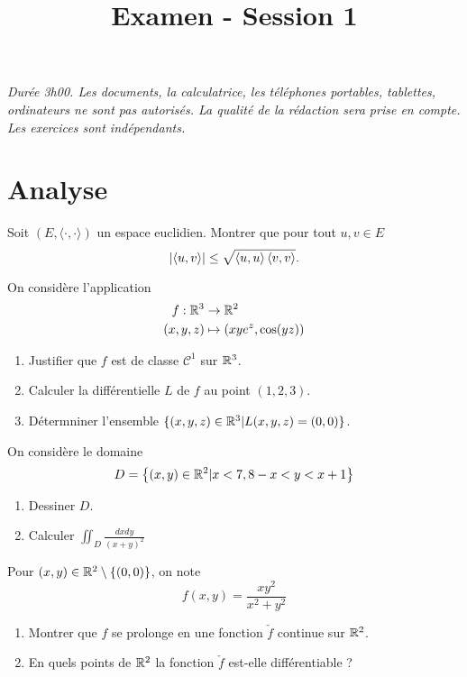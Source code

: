 \documentclass{tp_um}
\title{\Large \sffamily\bfseries Examen - Session 1}
\begin{document}
\maketitle

\bigskip

\textit{Durée 3h00. Les documents, la calculatrice, les téléphones portables, tablettes, ordinateurs ne sont pas autorisés. La qualité de la rédaction sera prise en compte. Les exercices sont indépendants.} 

\bigskip
\bigskip

\section{Analyse}

\exo{} Soit $(E,\langle\cdot,\cdot\rangle)$ un espace euclidien. Montrer que pour tout $u,v\in E$ 
\[
	\left\lvert\left\langle u,v\right\rangle\right\rvert \leq \sqrt{\left\langle u,u\right\rangle \left\langle v,v\right\rangle}.
\]

\exo{}
On considère l'application 
\begin{align*}
	f : \mathbb{R}^3 & \to \mathbb{R}^2 \\
(x,y,z) & \mapsto (xye^z,\cos(yz))
\end{align*}
\begin{enumerate}
	\item Justifier que $f$ est de classe $\mathcal C^1$ sur $\mathbb{R}^3$.
	\item Calculer la différentielle $L$ de $f$ au point $(1,2,3)$.
	\item Détermniner l'ensemble $\{ (x,y,z)\in \mathbb{R}^3 | L(x,y,z) = (0,0) \}$. 
\end{enumerate}

\exo{} On considère le domaine 
\[
	D = \left\{ (x,y) \in\mathbb{R}^2 | x <7, 8-x <y<x+1 \right\}
\]
\begin{enumerate}
	\item Dessiner $D$.
	\item Calculer $\iint_D \frac{dxdy}{(x+y)^2}$
\end{enumerate}


\exo{} Pour $(x,y) \in \mathbb{R}^2\setminus\left\{ (0,0) \right\}$, on note 
\[
	f(x,y) = \frac{xy^2}{x^2 + y^2}
\]
\begin{enumerate}
	\item Montrer que $f$ se prolonge en une fonction $\check f$ continue sur $\mathbb{R}^2$.
	\item En quels points de $\mathbb{R}^2$ la fonction $\check f$ est-elle différentiable ?
\end{enumerate}
\end{document}
